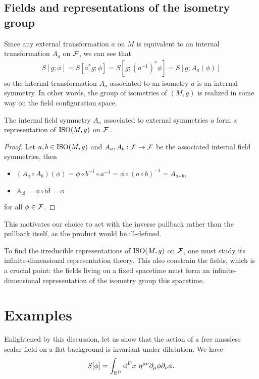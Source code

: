 \documentclass[a4paper,10pt]{article}
\begin{document}
    \subsection{Fields and representations of the isometry group}

        
        
        Since any external transformation $a$ on $M$ is equivalent to an internal transformation $A_a$ on $\mathcal{F}$, we can see that
        \begin{eqnarray}
            S[g;\phi]=S[a^*g;\phi]=S[g;(a^{-1})^*\phi]=S[g;A_a(\phi)]
        \end{eqnarray}
        so the internal transformation $A_a$ associated to an isometry $a$ is an internal symmetry. In other words, the group of isometries of $(M,g)$ is realized in some way on the field configuration space.
        \begin{prop}
            The internal field symmetry $A_a$ associated to external symmetries $a$ form a representation of $\text{ISO}(M,g)$ on $\mathcal{F}$.
        \end{prop}
        \begin{proof}
            Let $a,b\in\text{ISO}(M,g)$ and $A_a,A_b:\mathcal{F}\to\mathcal{F}$ be the associated internal field symmetries, then
            \begin{itemize}
                \item $(A_a\circ A_b)(\phi)=\phi\circ b^{-1}\circ a^{-1} = \phi\circ(a\circ b)^{-1} = A_{a\circ b}$,
                \item $A_{\text{id}} = \phi\circ\text{id}=\phi$
            \end{itemize}
            for all $\phi\in\mathcal{F}$.
        \end{proof}
        This motivates our choice to act with the inverse pullback rather than the pullback itself, as the product would be ill-defined.

        To find the irreducible representations of $\text{ISO}(M,g)$ on $\mathcal{F}$, one must study its infinite-dimensional representation theory. This also constrain the fields, which is a crucial point: the fields living on a fixed spacetime must form an infinite-dimensional representation of the isometry group this spacetime.
    
\section{Examples}

    \begin{examp}
            Enlightened by this discussion, let us show that the action of a free massless scalar field on a flat background is invariant under dilatation. We have
            \begin{equation}
                S[\phi]=\int_{\mathbb{R}^D}\text{d}^Dx~\eta^{\mu\nu}\partial_\mu\phi\partial_\nu\phi.
            \end{equation}
    \end{examp}

\pagebreak

\nocite{*}



\printbibliography
\end{document}
